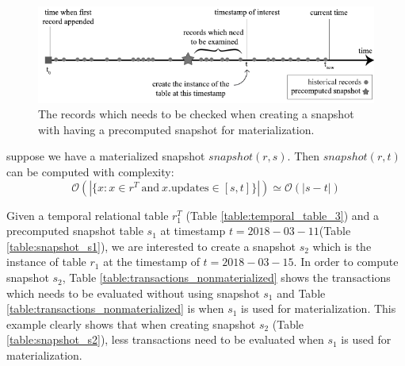 			\begin{figure}
				\centering
				\includegraphics[width=\textwidth]{figs/snapshot_materialization.pdf}
				\caption{The records which needs to be checked when creating a snapshot with having a precomputed snapshot for materialization.}
				\label{fig:snapshot_materialization}
			\end{figure}

			\begin{prop}
				suppose we have a materialized snapshot $snapshot(r,s)$. Then $snapshot(r,t)$ can be computed with complexity:
				$$\mathcal{O}(|\{x: x\in r^T\mathrm{\ and\ } x.\mathrm{updates} \in [s,t]\}|) \simeq \mathcal{O}(|s-t|)$$
			\label{prop:materialized_snapshot_complexity}
			\end{prop}

			\begin{example}
				Given a temporal relational table $r_1^T$ (Table \ref{table:temporal_table_3}) and a precomputed snapshot table $s_1$ at timestamp $t = 2018-03-11$(Table \ref{table:snapshot_s1}), we are interested to create a snapshot $s_2$ which is the instance of table $r_1$ at the timestamp of $t = 2018-03-15$. In order to compute snapshot $s_2$, Table \ref{table:transactions_nonmaterialized} shows the transactions which needs to be evaluated without using snapshot $s_1$ and Table \ref{table:transactions_nonmaterialized} is when $s_1$ is used for materialization. This example clearly shows that when creating snapshot $s_2$ (Table \ref{table:snapshot_s2}), less transactions need to be evaluated when $s_1$ is used for materialization.
			\label{example:materialized_snapshot_complexity}
			\end{example}

